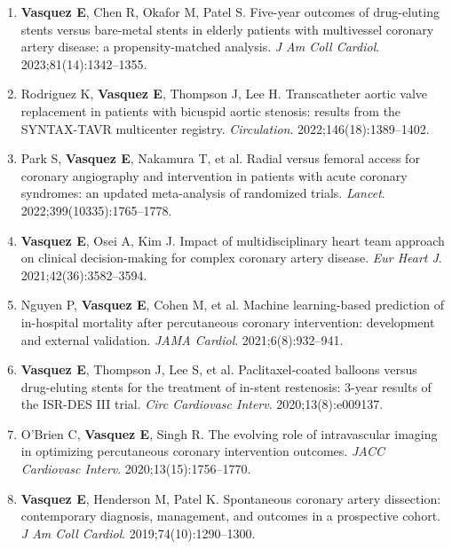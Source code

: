 \documentclass[11pt,a4paper]{article}
\begin{document}
{\color{darktext}
\vspace{-4pt}
\begin{enumerate}[leftmargin=*, itemsep=2pt, topsep=0pt]

\item \textbf{Vasquez E}, Chen R, Okafor M, Patel S. Five-year outcomes of drug-eluting stents versus bare-metal stents in elderly patients with multivessel coronary artery disease: a propensity-matched analysis. \textit{J Am Coll Cardiol}. 2023;81(14):1342--1355.

\item Rodriguez K, \textbf{Vasquez E}, Thompson J, Lee H. Transcatheter aortic valve replacement in patients with bicuspid aortic stenosis: results from the SYNTAX-TAVR multicenter registry. \textit{Circulation}. 2022;146(18):1389--1402.

\item Park S, \textbf{Vasquez E}, Nakamura T, et al. Radial versus femoral access for coronary angiography and intervention in patients with acute coronary syndromes: an updated meta-analysis of randomized trials. \textit{Lancet}. 2022;399(10335):1765--1778.

\item \textbf{Vasquez E}, Osei A, Kim J. Impact of multidisciplinary heart team approach on clinical decision-making for complex coronary artery disease. \textit{Eur Heart J}. 2021;42(36):3582--3594.

\item Nguyen P, \textbf{Vasquez E}, Cohen M, et al. Machine learning-based prediction of in-hospital mortality after percutaneous coronary intervention: development and external validation. \textit{JAMA Cardiol}. 2021;6(8):932--941.

\item \textbf{Vasquez E}, Thompson J, Lee S, et al. Paclitaxel-coated balloons versus drug-eluting stents for the treatment of in-stent restenosis: 3-year results of the ISR-DES III trial. \textit{Circ Cardiovasc Interv}. 2020;13(8):e009137.

\item O'Brien C, \textbf{Vasquez E}, Singh R. The evolving role of intravascular imaging in optimizing percutaneous coronary intervention outcomes. \textit{JACC Cardiovasc Interv}. 2020;13(15):1756--1770.

\item \textbf{Vasquez E}, Henderson M, Patel K. Spontaneous coronary artery dissection: contemporary diagnosis, management, and outcomes in a prospective cohort. \textit{J Am Coll Cardiol}. 2019;74(10):1290--1300.


\end{enumerate}}
\end{document}
